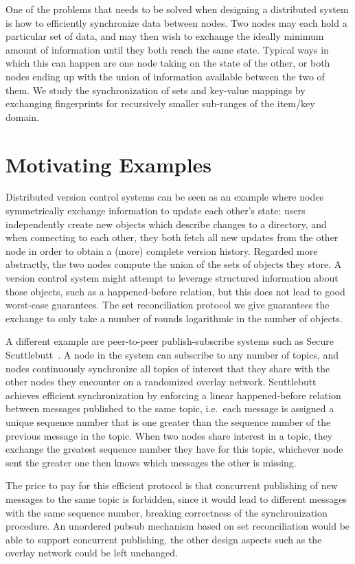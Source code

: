 
One of the problems that needs to be solved when designing a distributed system is how to efficiently synchronize data between nodes.
Two nodes may each hold a particular set of data, and may then wish to exchange the ideally minimum amount of information until they both reach the same state.
Typical ways in which this can happen are one node taking on the state of the other, or both nodes ending up with the union of information available between the two of them.
We study the synchronization of sets and key-value mappings by exchanging fingerprints for recursively smaller sub-ranges of the item/key domain.

\section{Motivating Examples}

Distributed version control systems can be seen as an example where nodes symmetrically exchange information to update each other's state: users independently create new objects which describe changes to a directory, and when connecting to each other, they both fetch all new updates from the other node in order to obtain a (more) complete version history.
Regarded more abstractly, the two nodes compute the union of the sets of objects they store.
A version control system might attempt to leverage structured information about those objects, such as a happened-before relation, but this does not lead to good worst-case guarantees.
The set reconciliation protocol we give guarantees the exchange to only take a number of rounds logarithmic in the number of objects.

A different example are peer-to-peer publish-subscribe systems such as
Secure Scuttlebutt~\cite{tarr2019secure}. A node in the system can subscribe to
any number of topics, and nodes continuously synchronize all topics of interest that they share
with the other nodes they encounter on a randomized overlay network. Scuttlebutt achieves
efficient synchronization by enforcing a linear happened-before
relation between messages published to the same topic, i.e.~each message
is assigned a unique sequence number that is one greater than the
sequence number of the previous message in the topic. When two nodes share interest
in a topic, they exchange the greatest sequence number they have for
this topic, whichever node sent the greater one then knows which
messages the other is missing.

The price to pay for this efficient protocol is that concurrent publishing of new
messages to the same topic is forbidden, since it would lead to
different messages with the same sequence number, breaking correctness
of the synchronization procedure. An unordered pubsub mechanism based on
set reconciliation would be able to support concurrent publishing, the
other design aspects such as the overlay network could be left
unchanged.

